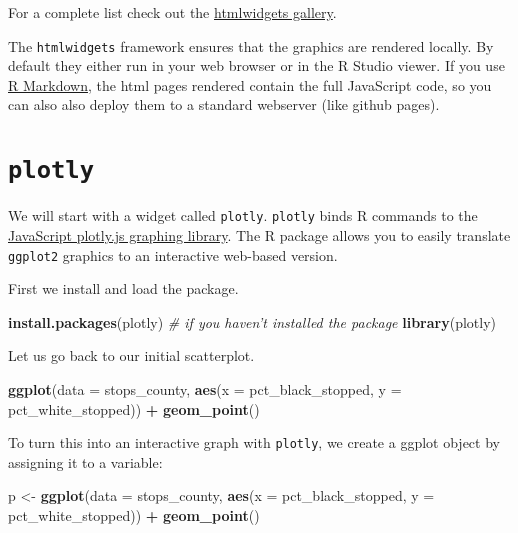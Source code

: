 \documentclass[]{book}
\newenvironment{Shaded}{\begin{snugshade}}{\end{snugshade}}
\newcommand{\CommentTok}[1]{\textcolor[rgb]{0.56,0.35,0.01}{\textit{#1}}}
\newcommand{\DataTypeTok}[1]{\textcolor[rgb]{0.13,0.29,0.53}{#1}}
\newcommand{\KeywordTok}[1]{\textcolor[rgb]{0.13,0.29,0.53}{\textbf{#1}}}
\newcommand{\NormalTok}[1]{#1}
\newcommand{\OperatorTok}[1]{\textcolor[rgb]{0.81,0.36,0.00}{\textbf{#1}}}
\newcommand{\StringTok}[1]{\textcolor[rgb]{0.31,0.60,0.02}{#1}}
\begin{document}
For a complete list check out the \href{http://gallery.htmlwidgets.org}{htmlwidgets gallery}.

The \texttt{htmlwidgets} framework ensures that the graphics are rendered locally. By default they either run in your web browser or in the R Studio viewer. If you use \href{https://rmarkdown.rstudio.com/}{R Markdown}, the html pages rendered contain the full JavaScript code, so you can also also deploy them to a standard webserver (like github pages).

\hypertarget{plotly}{%
\section{\texorpdfstring{\textbf{\texttt{plotly}}}{plotly}}\label{plotly}}

We will start with a widget called \texttt{plotly}. \texttt{plotly} binds R commands to the \href{https://plot.ly/javascript/}{JavaScript plotly.js graphing library}. The R package allows you to easily translate \texttt{ggplot2} graphics to an interactive web-based version.

First we install and load the package.

\begin{Shaded}
\begin{Highlighting}[]
\KeywordTok{install.packages}\NormalTok{(plotly) }\CommentTok{# if you haven't installed the package}
\KeywordTok{library}\NormalTok{(plotly)}
\end{Highlighting}
\end{Shaded}

Let us go back to our initial scatterplot.

\begin{Shaded}
\begin{Highlighting}[]
\KeywordTok{ggplot}\NormalTok{(}\DataTypeTok{data =}\NormalTok{ stops_county, }\KeywordTok{aes}\NormalTok{(}\DataTypeTok{x =}\NormalTok{ pct_black_stopped, }\DataTypeTok{y =}\NormalTok{ pct_white_stopped)) }\OperatorTok{+}
\StringTok{  }\KeywordTok{geom_point}\NormalTok{()}
\end{Highlighting}
\end{Shaded}

To turn this into an interactive graph with \texttt{plotly}, we create a ggplot object by assigning it to a variable:

\begin{Shaded}
\begin{Highlighting}[]
\NormalTok{p <-}\StringTok{ }\KeywordTok{ggplot}\NormalTok{(}\DataTypeTok{data =}\NormalTok{ stops_county, }\KeywordTok{aes}\NormalTok{(}\DataTypeTok{x =}\NormalTok{ pct_black_stopped, }\DataTypeTok{y =}\NormalTok{ pct_white_stopped)) }\OperatorTok{+}
\StringTok{  }\KeywordTok{geom_point}\NormalTok{()}
\end{Highlighting}
\end{Shaded}
\end{document}
